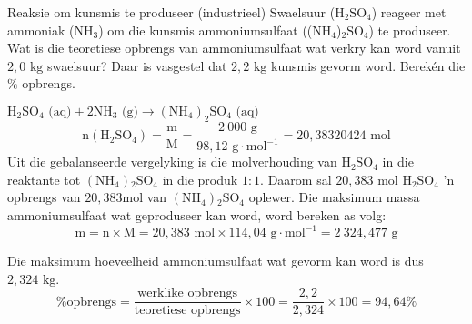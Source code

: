  \label{m38712*secfhsst!!!underscore!!!id2067}
      \noindent 
      \begin{wex}{Reaksie om kunsmis te produseer (industrieel) }
{
\label{m38712*probfhsst!!!underscore!!!id2068}
      \label{m38712*id284606}Swaelsuur ($\text{H}{}_{2}\text{SO}{}_{4}$) reageer met ammoniak ($\text{NH}{}_{3}$) om die kunsmis ammoniumsulfaat (($\text{NH}{}_{4}$)${}_{2}\text{SO}{}_{4}$) te produseer. Wat is die teoretiese opbrengs van ammoniumsulfaat wat verkry kan word vanuit $2,0 \text{ kg}$ swaelsuur? Daar is vasgestel dat $2,2 \text{ kg}$ kunsmis gevorm word. Berekén die $\%$ opbrengs. }
{
      \label{m38712*id284813}\nopagebreak\noindent{}
\label{m38712*id284690}${\text{H}}_{2}{\text{SO}}_{4} \text{ (aq)} + 2{\text{NH}}_{3}\text{ (g)} \to {({\text{NH}}_{4})}_{2}{\text{SO}}_{4}  \text{ (aq)}$
    \begin{equation*}
    \text{n} ({\text{H}}_{2}{\text{SO}}_{4}) = \frac{\text{m}}{\text{M}} = \frac{2~000 \text{ g}}{98,12 \text{ g} \cdot {\text{mol}}^{-1}} = 20,38320424\text{ mol}
      \end{equation*}
      \label{m38712*id285156}Uit die gebalanseerde vergelyking is die molverhouding van $\text{H}{}_{2}\text{SO}{}_{4}$ in die reaktante tot $(\text{NH}{}_{4}){}_{2}\text{SO}{}_{4}$ in die produk $1:1$. Daarom sal $20,383 \text{ mol}$ $\text{H}{}_{2}\text{SO}{}_{4}$ 'n opbrengs van $20,383 \text{mol}$ van $(\text{NH}{}_{4}){}_{2}\text{SO}{}_{4}$ oplewer. 
      \label{m38712*id285290}Die maksimum massa ammoniumsulfaat wat geproduseer kan word, word bereken as volg:
      \label{m38712*id285296}\nopagebreak\noindent{}
    \begin{equation*}
    \text{m}=\text{n} \times \text{M} = 20,383 \text{ mol} \times 114,04 \text{ g} \cdot {\text{mol}}^{-1} = 2~324,477 \text{ g}
      \end{equation*}
      
      \label{m38712*id285362}Die maksimum hoeveelheid ammoniumsulfaat wat gevorm kan word is dus $2,324 \text{ kg}$.
\begin{equation*}
\text{\% opbrengs} = \frac{\text{werklike opbrengs}}{\text{teoretiese opbrengs}} \times 100 = \frac{2,2}{2,324} \times 100 = 94,64 \%\end{equation*}
}
    \end{wex}
\label{m38717*secfhsst!!!underscore!!!id695}



